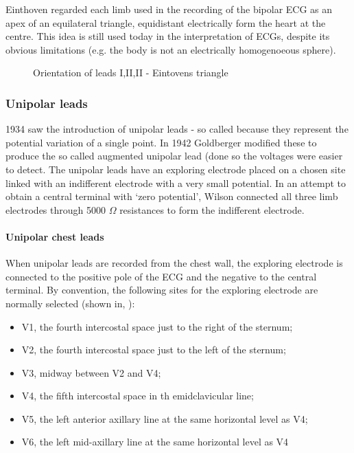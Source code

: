 Einthoven regarded each limb used in the recording of the bipolar ECG as an
apex of an equilateral triangle, equidistant electrically form the heart at
the centre. This idea is still used today in the interpretation
of ECGs, despite its obvious limitations (e.g. the body is not an electrically
homogenoeous sphere).

\begin{figure}[htpb] \centering
  
  \caption{Orientation of leads I,II,II - Eintovens triangle}
  \label{fig:ET}
\end{figure}


\subsubsection{Unipolar leads}
1934 saw the introduction of unipolar leads - so called because they represent
the potential variation of a single point.  In 1942 Goldberger modified these
to produce the so called augmented unipolar lead (done so the voltages were
easier to detect.
The unipolar leads have an exploring electrode placed on a chosen site linked with an
indifferent electrode with a very small potential. In an attempt to obtain a
central terminal with `zero potential', Wilson connected all three limb
electrodes through 5000 $\Omega $ resistances to form the indifferent
electrode.

\paragraph{Unipolar chest leads}
When unipolar leads are recorded from the chest wall, the exploring electrode
is connected to the positive pole of the ECG and the negative to the central
terminal. By convention, the following sites for the exploring electrode
 are normally selected (shown in, ):
\begin{itemize}
\item V1, the fourth intercostal space just to the right of the sternum;
\item V2,  the fourth intercostal space just to the left of the sternum;
\item V3, midway between V2 and V4;
\item V4, the fifth intercostal space in th emidclavicular line;
\item V5, the left anterior axillary line at the same horizontal level as
  V4;
\item V6, the left mid-axillary line at the same horizontal level as V4
\end{itemize}

